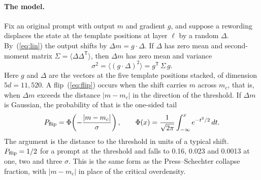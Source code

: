 \documentclass[11pt]{article}
\newcommand{\mc}{m_c}
\newcommand{\Dm}{\Delta m}
\begin{document}
\paragraph{The model.} Fix an original prompt with output $m$ and gradient $g$, and suppose a rewording displaces the state at the template positions at layer $\ell$ by a random $\Delta$. By~(\ref{eq:lin}) the output shifts by $\Dm=g\cdot\Delta$. If $\Delta$ has zero mean and second-moment matrix $\Sigma=\langle\Delta\Delta^{\mathsf T}\rangle$, then $\Dm$ has zero mean and variance
\begin{equation}
\sigma^2=\langle (g\cdot\Delta)^2\rangle = g^{\mathsf T}\,\Sigma\, g .
\label{eq:sigma}
\end{equation}
Here $g$ and $\Delta$ are the vectors at the five template positions stacked, of dimension $5d=11{,}520$. A flip~(\ref{eq:flip}) occurs when the shift carries $m$ across $\mc$, that is, when $\Dm$ exceeds the distance $|m-\mc|$ in the direction of the threshold. If $\Dm$ is Gaussian, the probability of that is the one-sided tail
\begin{equation}
P_{\rm flip}=\Phi\!\left(-\frac{|m-\mc|}{\sigma}\right),\qquad
\Phi(x)=\frac{1}{\sqrt{2\pi}}\int_{-\infty}^{x}e^{-t^2/2}\,dt .
\label{eq:pflip}
\end{equation}
The argument is the distance to the threshold in units of a typical shift. $P_{\rm flip}=1/2$ for a prompt at the threshold and falls to 0.16, 0.023 and 0.0013 at one, two and three $\sigma$. This is the same form as the Press--Schechter collapse fraction, with $|m-\mc|$ in place of the critical overdensity.
\end{document}
